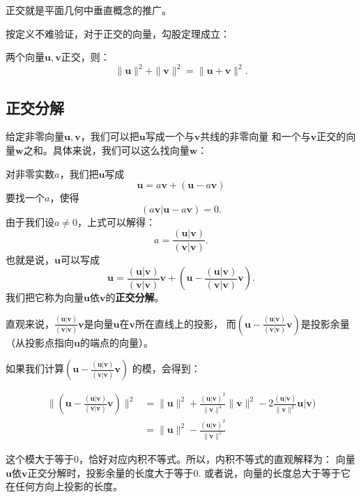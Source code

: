 \documentclass[12pt,UTF8]{ctexbook}
\begin{document}
正交就是平面几何中垂直概念的推广。

按定义不难验证，对于正交的向量，勾股定理成立：
\begin{pp}\label{pp:7_2}
    两个向量$\mathbf{u}, \mathbf{v}$正交，则：
    $$ \|\mathbf{u}\|^2 + \|\mathbf{v}\|^2 = \|\mathbf{u} + \mathbf{v}\|^2.$$
\end{pp}

\subsection{正交分解}
给定非零向量$\mathbf{u}, \mathbf{v}$，我们可以把$\mathbf{u}$写成一个与$\mathbf{v}$共线的非零向量
和一个与$\mathbf{v}$正交的向量$\mathbf{w}$之和。具体来说，我们可以这么找向量$\mathbf{w}$：

对非零实数$a$，我们把$\mathbf{u}$写成
$$\mathbf{u} = a\mathbf{v} + (\mathbf{u} - a\mathbf{v}) $$
要找一个$a$，使得
$$ (a\mathbf{v} | \mathbf{u} - a\mathbf{v}) = 0.$$
由于我们设$a \neq 0$，上式可以解得：
$$ a = \frac{(\mathbf{u} | \mathbf{v})}{(\mathbf{v} | \mathbf{v})}.$$
也就是说，$\mathbf{u}$可以写成
$$\mathbf{u} = \frac{(\mathbf{u} | \mathbf{v})}{(\mathbf{v} | \mathbf{v})}\mathbf{v} + \left(\mathbf{u} - \frac{(\mathbf{u} | \mathbf{v})}{(\mathbf{v} | \mathbf{v})}\mathbf{v}\right). $$
我们把它称为向量$\mathbf{u}$依$\mathbf{v}$的\textbf{正交分解}。

直观来说，$\frac{(\mathbf{u} | \mathbf{v})}{(\mathbf{v} | \mathbf{v})}\mathbf{v}$是向量$\mathbf{u}$在$\mathbf{v}$所在直线上的投影，
而$\left(\mathbf{u} - \frac{(\mathbf{u} | \mathbf{v})}{(\mathbf{v} | \mathbf{v})}\mathbf{v}\right)$是投影余量（从投影点指向$\mathbf{u}$的端点的向量）。

如果我们计算$\left(\mathbf{u} - \frac{(\mathbf{u} | \mathbf{v})}{(\mathbf{v} | \mathbf{v})}\mathbf{v}\right)$ 的模，会得到：

\begin{align*}
    \|\left(\mathbf{u} - \frac{(\mathbf{u} | \mathbf{v})}{(\mathbf{v} | \mathbf{v})}\mathbf{v}\right)\|^2 &= 
    \|\mathbf{u}\|^2 + \frac{(\mathbf{u} | \mathbf{v})^2}{\|\mathbf{v} \|^4} \|\mathbf{v} \|^2 - 2 \frac{(\mathbf{u} | \mathbf{v})}{\|\mathbf{v} \|^2} \mathbf{u} | \mathbf{v})  \\
    &= \|\mathbf{u}\|^2 - \frac{(\mathbf{u} | \mathbf{v})^2}{\|\mathbf{v} \|^2}  
\end{align*}

这个模大于等于0，恰好对应内积不等式。所以，内积不等式的直观解释为：
向量$\mathbf{u}$依$\mathbf{v}$正交分解时，投影余量的长度大于等于0. 
或者说，向量的长度总大于等于它在任何方向上投影的长度。
\end{document}
